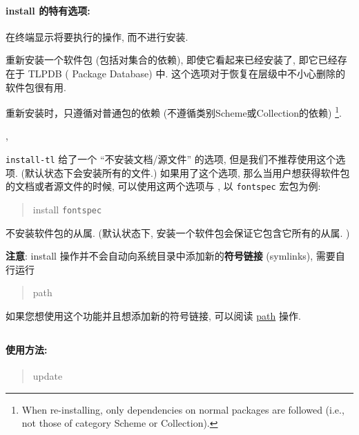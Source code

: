 \paragraph{{\mdseries\ac{install}} 的特有选项:}
\begin{description}
    \item {}\par
    在终端显示将要执行的操作, 而不进行安装. 
    \item {}\par
    重新安装一个软件包 (包括对集合的依赖), 即使它看起来已经安装了, 即它已经存在于 TLPDB (\tl{} Package Database) 中. 这个选项对于恢复在层级中不小心删除的软件包很有用. 

    重新安装时，只遵循对普通包的依赖 (不遵循类别Scheme或Collection的依赖)%
    \footnote{When re-installing, only dependencies on normal packages are followed (i.e., not those of category Scheme or Collection).}. 
    \item {}, \par
    \texttt{install-tl} 给了一个 ``不安装文档/源文件'' 的选项, 但是我们不推荐使用这个选项. (默认状态下会安装所有的文件.) 如果用了这个选项, 那么当用户想获得软件包的文档或者源文件的时候, 可以使用这两个选项与 , 以 \texttt{fontspec} 宏包为例: 
    \begin{quote}
        \tlmgr{} \ac{install}    \texttt{fontspec}
    \end{quote}
    \item {}\par
    不安装软件包的从属. (默认状态下, 安装一个软件包会保证它包含它所有的从属. )
\end{description}

    \textbf{注意}: \ac{install} 操作并不会自动向系统目录中添加新的\textbf{符号链接} (symlinks), 需要自行运行
    \begin{quote}
        \tlmgr{} \ac{path} 
    \end{quote}
    如果您想使用这个功能并且想添加新的符号链接, 可以阅读 \href{https://www.tug.org/texlive/doc/tlmgr.html#path}{path} 操作. 

\subsection{}\label{subsec:update}

\paragraph{使用方法:}
\begin{quote}
    \tlmgr{} \ac{update} 
\end{quote}

